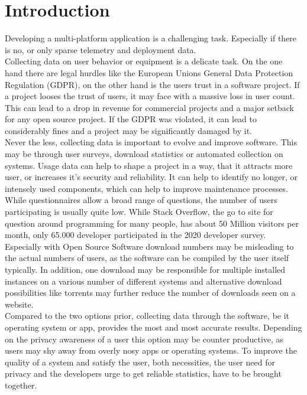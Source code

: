 \chapter{Introduction}
\label{chap:introduction}
%
Developing a multi-platform application is a challenging task. Especially if 
there is no, or only sparse telemetry and deployment data.\\

Collecting data on user behavior or equipment is a delicate task. On the one hand there are legal hurdles like the European Unions General Data Protection Regulation (GDPR), on the other hand is the users trust in a software project. If a project looses the trust of users, it may face with a massive loss in user count. This can lead to a drop in revenue for commercial projects and a major setback for any open source project. If the GDPR was violated, it can lead to considerably fines and a project may be significantly damaged by it.\\

Never the less, collecting data is important to evolve and improve software. This may be through
user surveys, download statistics or automated collection on systems.
Usage data can help to shape a project in a way, that it attracts more user, or increases it's security and reliability.
It can help to identify no longer, or intensely used components, which can help to improve maintenance processes.\\
While questionnaires allow a broad range of questions, the number of users participating is usually quite low. While Stack Overflow, the go to site for question around programming for many people, has about 50 Million visitors per month, only 65.000 developer participated in the 2020 developer survey\cite{noauthor_stack_nodate}.
Especially with Open Source Software download numbers may be misleading to the actual numbers of users, as the software can be compiled by the user itself typically. In addition, one download may be responsible for multiple installed instances on a various number of different systems and alternative download possibilities like torrents may further reduce the number of downloads seen on a website.\\

Compared to the two options prior, collecting data through the software, be it operating system or app, provides the most and most accurate results. Depending on the privacy awareness of a user this option may be counter productive, as users may shy away from overly nosy apps or operating systems. To improve the quality of a system and satisfy the user, both necessities, the user need for privacy and the developers urge to get reliable statistics, have to be brought together.\\

